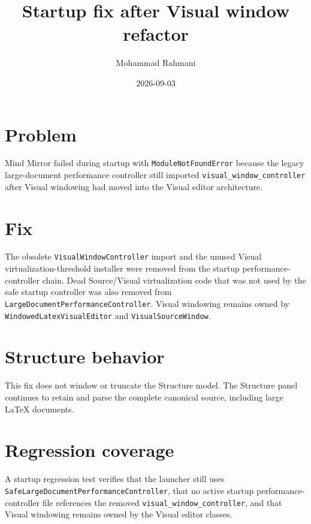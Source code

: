 \documentclass[a4paper]{article}
\title{Startup fix after Visual window refactor}
\date{2026-09-03}
\author{Mohammad Rahmani}
\begin{document}
   \maketitle

   \section{Problem}
   Mind Mirror failed during startup with \texttt{ModuleNotFoundError} because the legacy large-document performance controller still imported \texttt{visual\_window\_controller} after Visual windowing had moved into the Visual editor architecture.

   \section{Fix}
   The obsolete \texttt{VisualWindowController} import and the unused Visual virtualization-threshold installer were removed from the startup performance-controller chain. Dead Source/Visual virtualization code that was not used by the safe startup controller was also removed from \texttt{LargeDocumentPerformanceController}. Visual windowing remains owned by \texttt{WindowedLatexVisualEditor} and \texttt{VisualSourceWindow}.

   \section{Structure behavior}
   This fix does not window or truncate the Structure model. The Structure panel continues to retain and parse the complete canonical source, including large LaTeX documents.

   \section{Regression coverage}
   A startup regression test verifies that the launcher still uses \texttt{SafeLargeDocumentPerformanceController}, that no active startup performance-controller file references the removed \texttt{visual\_window\_controller}, and that Visual windowing remains owned by the Visual editor classes.
\end{document}
